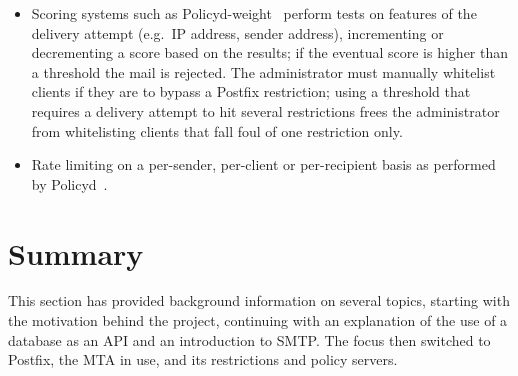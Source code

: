 \begin{itemize}
        \begin{table}[ht]
            \caption{Summary of rejections}\label{Summary of rejections}
            
        \end{table}

    \item Scoring systems such as Policyd-weight~\cite{policyd-weight}
        perform tests on features of the delivery attempt (e.g.\ \gls{IP}
        address, sender address), incrementing or decrementing a score
        based on the results; if the eventual score is higher than a
        threshold the mail is rejected.  The administrator must manually
        whitelist clients if they are to bypass a Postfix restriction;
        using a threshold that requires a delivery attempt to hit several
        restrictions frees the administrator from whitelisting clients that
        fall foul of one restriction only.

    \item Rate limiting on a per-sender, per-client or per-recipient basis
        as performed by Policyd~\cite{policyd}.

\end{itemize}



\section{Summary}

This section has provided background information on several topics,
starting with the motivation behind the project, continuing with an
explanation of the use of a database as an \gls{API} and an introduction to
\gls{SMTP}.  The focus then switched to Postfix, the \gls{MTA} in use, and
its restrictions and policy servers.

